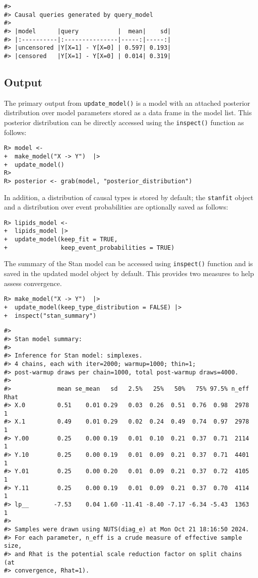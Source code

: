 \documentclass[
  11pt,
  article]{jss}
\begin{document}
\begin{verbatim}
#> 
#> Causal queries generated by query_model
#> 
#> |model      |query           |  mean|    sd|
#> |:----------|:---------------|-----:|-----:|
#> |uncensored |Y[X=1] - Y[X=0] | 0.597| 0.193|
#> |censored   |Y[X=1] - Y[X=0] | 0.014| 0.319|
\end{verbatim}

\subsection{Output}\label{output}

The primary output from \texttt{update\_model()} is a model with an
attached posterior distribution over model parameters stored as a data
frame in the model list. This posterior distribution can be directly
accessed using the \texttt{inspect()} function as follows:

\begin{verbatim}
R> model <-
+  make_model("X -> Y")  |> 
+  update_model()
R> 
R> posterior <- grab(model, "posterior_distribution")  
\end{verbatim}

In addition, a distribution of causal types is stored by default; the
\texttt{stanfit} object and a distribution over event probabilities are
optionally saved as follows:

\begin{verbatim}
R> lipids_model <- 
+  lipids_model |> 
+  update_model(keep_fit = TRUE,
+               keep_event_probabilities = TRUE)
\end{verbatim}

The summary of the Stan model can be accessed using \texttt{inspect()}
function and is saved in the updated model object by default. This
provides two measures to help assess convergence.

\begin{verbatim}
R> make_model("X -> Y")  |> 
+  update_model(keep_type_distribution = FALSE) |>
+  inspect("stan_summary") 
\end{verbatim}

\begin{verbatim}
#> 
#> Stan model summary:
#> 
#> Inference for Stan model: simplexes.
#> 4 chains, each with iter=2000; warmup=1000; thin=1; 
#> post-warmup draws per chain=1000, total post-warmup draws=4000.
#> 
#>             mean se_mean   sd   2.5%   25%   50%   75% 97.5% n_eff Rhat
#> X.0         0.51    0.01 0.29   0.03  0.26  0.51  0.76  0.98  2978    1
#> X.1         0.49    0.01 0.29   0.02  0.24  0.49  0.74  0.97  2978    1
#> Y.00        0.25    0.00 0.19   0.01  0.10  0.21  0.37  0.71  2114    1
#> Y.10        0.25    0.00 0.19   0.01  0.09  0.21  0.37  0.71  4401    1
#> Y.01        0.25    0.00 0.20   0.01  0.09  0.21  0.37  0.72  4105    1
#> Y.11        0.25    0.00 0.19   0.01  0.09  0.21  0.37  0.70  4114    1
#> lp__       -7.53    0.04 1.60 -11.41 -8.40 -7.17 -6.34 -5.43  1363    1
#> 
#> Samples were drawn using NUTS(diag_e) at Mon Oct 21 18:16:50 2024.
#> For each parameter, n_eff is a crude measure of effective sample size,
#> and Rhat is the potential scale reduction factor on split chains (at 
#> convergence, Rhat=1).
\end{verbatim}
\end{document}
